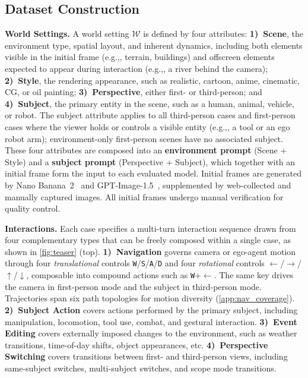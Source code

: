 \documentclass{llmxive}
\providecommand{\eg}{e.g.,\xspace}
\providecommand{\etc}{etc.\xspace}
\providecommand{\myparagraph}[1]{\vspace{-0.1em}\noindent\textbf{#1}\hspace{0.3em}}
\begin{document}
\subsection{Dataset Construction}
\label{sec:ontology}

\myparagraph{World Settings.}
A world setting $\mathcal{W}$ is defined by four attributes:
\textbf{1)~Scene}, the environment type, spatial layout, and inherent dynamics, including both elements visible in the initial frame (\eg, terrain, buildings) and offscreen elements expected to appear during interaction (\eg, a river behind the camera);
\textbf{2)~Style}, the rendering appearance, such as realistic, cartoon, anime, cinematic, CG, or oil painting;
\textbf{3)~Perspective}, either first- or third-person;
and \textbf{4)~Subject}, the primary entity in the scene, such as a human, animal, vehicle, or robot. The subject attribute applies to all third-person cases and first-person cases where the viewer holds or controls a visible entity (\eg, a tool or an ego robot arm); environment-only first-person scenes have no associated subject.
These four attributes are composed into an \textbf{environment prompt} (Scene + Style) and a \textbf{subject prompt} (Perspective + Subject), which together with an initial frame form the input to each evaluated model.
Initial frames are generated by Nano Banana~2~\cite{google2025nanobanana2} and GPT-Image-1.5~\cite{openai2025gptimage}, supplemented by web-collected and manually captured images. All initial frames undergo manual verification for quality control.


\myparagraph{Interactions.}
Each case specifies a multi-turn interaction sequence drawn from four complementary types that can be freely composed within a single case, as shown in \cref{fig:teaser} (top).
\textbf{1)~Navigation} governs camera or ego-agent motion through four \emph{translational} controls \texttt{W}/\texttt{S}/\texttt{A}/\texttt{D} and four \emph{rotational} controls $\leftarrow$/$\rightarrow$/$\uparrow$/$\downarrow$, composable into compound actions such as \texttt{W}+$\leftarrow$. The same key drives the camera in first-person mode and the subject in third-person mode. Trajectories span six path topologies for motion diversity (\cref{app:nav_coverage}).
\textbf{2)~Subject Action} covers actions performed by the primary subject, including manipulation, locomotion, tool use, combat, and gestural interaction.
\textbf{3)~Event Editing} covers externally imposed changes to the environment, such as weather transitions, time-of-day shifts, object appearances, \etc
\textbf{4)~Perspective Switching} covers transitions between first- and third-person views, including same-subject switches, multi-subject switches, and scope mode transitions.
\end{document}
